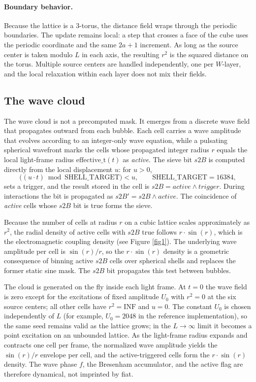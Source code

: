 \documentclass{ijuc}
\begin{document}
\paragraph{Boundary behavior.}
Because the lattice is a 3-torus, the distance field wraps through the periodic boundaries.  The update remains local: a step that crosses a face of the cube uses the periodic coordinate and the same $2a+1$ increment.  As long as the source center is taken modulo $L$ in each axis, the resulting $r^{2}$ is the squared distance on the torus.  Multiple source centers are handled independently, one per $W$-layer, and the local relaxation within each layer does not mix their fields.

\subsection{The wave cloud}\label{subsec:Sine}

The wave cloud is not a precomputed mask. It emerges from a discrete wave field that propagates outward from each bubble. Each cell carries a wave amplitude that evolves according to an integer-only wave equation, while a pulsating spherical wavefront marks the cells whose propagated integer radius $r$ equals the local light-frame radius $\mathrm{effective\_t}(t)$ as \emph{active}. The sieve bit $s2B$ is computed directly from the local displacement $u$: for $u>0$,
\[
\bigl((u \cdot t) \bmod \mathrm{SHELL\_TARGET}\bigr) < u,
\qquad \mathrm{SHELL\_TARGET}=16384,
\]
sets a trigger, and the result stored in the cell is $s2B = \mathit{active} \land \mathit{trigger}$. During interactions the bit is propagated as $s2B' = s2B \land \mathit{active}$. The coincidence of \emph{active} cells whose $s2B$ bit is true forms the sieve.

Because the number of cells at radius $r$ on a cubic lattice scales approximately as $r^{2}$, the radial density of active cells with $s2B$ true follows $r\cdot\sin(r)$, which is the electromagnetic coupling density (see Figure \ref{fig1}). The underlying wave amplitude per cell is $\sin(r)/r$, so the $r\cdot\sin(r)$ density is a geometric consequence of binning active $s2B$ cells over spherical shells and replaces the former static sine mask. The $s2B$ bit propagates this test between bubbles.

The cloud is generated on the fly inside each light frame.  At $t=0$ the wave field is zero except for the excitations of fixed amplitude $U_{0}$ with $r^{2}=0$ at the six source centers; all other cells have $r^{2}=\mathrm{INF}$ and $u=0$.  The constant $U_{0}$ is chosen independently of $L$ (for example, $U_{0}=2048$ in the reference implementation), so the same seed remains valid as the lattice grows; in the $L\to\infty$ limit it becomes a point excitation on an unbounded lattice.  As the light-frame radius expands and contracts one cell per frame, the normalized wave amplitude yields the $\sin(r)/r$ envelope per cell, and the active-triggered cells form the $r\cdot\sin(r)$ density.  The wave phase $f$, the Bresenham accumulator, and the active flag are therefore dynamical, not imprinted by fiat.
\end{document}
